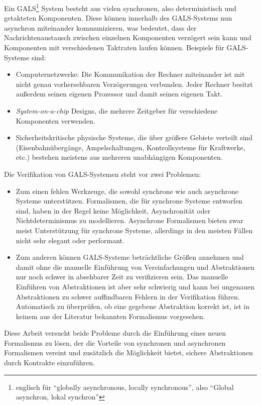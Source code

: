 Ein GALS\footnote{englisch für "`globally asynchronous, locally synchronous"', also "`Global asynchron, lokal synchron"'} System besteht aus vielen synchronen, also deterministisch und getakteten Komponenten.
Diese können innerhalb des GALS-Systems nun asynchron miteinander kommunizieren, was bedeutet, dass der Nachrichtenaustausch zwischen einzelnen Komponenten verzögert sein kann und Komponenten mit verschiedenen Taktraten laufen können.
Beispiele für GALS-Systeme sind:
\begin{itemize}
\item Computernetzwerke: Die Kommunikation der Rechner miteinander ist mit nicht genau vorhersehbaren Verzögerungen verbunden.
  Jeder Rechner besitzt außerdem seinen eigenen Prozessor und damit seinen eigenen Takt.
\item \emph{System-on-a-chip} Designs, die mehrere Zeitgeber für verschiedene Komponenten verwenden.
\item Sicherheitskritische physische Systeme, die über größere Gebiete verteilt sind (Eisenbahnübergänge, Ampelschaltungen, Kontrollsysteme für Kraftwerke, etc.) bestehen meistens aus mehreren unabhängigen Komponenten.
\end{itemize}

Die Verifikation von GALS-Systemen steht vor zwei Problemen:
\begin{itemize}
\item Zum einen fehlen Werkzeuge, die sowohl synchrone wie auch asynchrone Systeme unterstützen.
  Formalismen, die für synchrone Systeme entworfen sind, haben in der Regel keine Möglichkeit, Asynchronität oder Nichtdeterminismus zu modellieren.
  Asynchrone Formalismen bieten zwar meist Unterstützung für synchrone Systeme, allerdings in den meisten Fällen nicht sehr elegant oder performant.
\item Zum anderen können GALS-Systeme beträchtliche Größen annehmen und damit ohne die manuelle Einführung von Vereinfachungen und Abstraktionen nur noch schwer in absehbarer Zeit zu verifizieren sein.
  Das manuelle Einführen von Abstraktionen ist aber sehr schwierig und kann bei ungenauen Abstraktionen zu schwer auffindbaren Fehlern in der Verifikation führen.
  Automatisch zu überprüfen, ob eine gegebene Abstraktion korrekt ist, ist in keinem aus der Literatur bekannten Formalismus vorgesehen.
\end{itemize}
Diese Arbeit versucht beide Probleme durch die Einführung eines neuen Formalismus zu lösen, der die Vorteile von synchronen und asynchronen Formalismen vereint und zusätzlich die Möglichkeit bietet, sichere Abstraktionen durch Kontrakte einzuführen.
